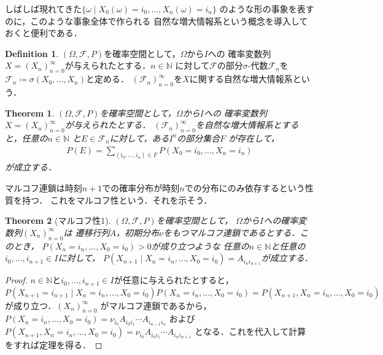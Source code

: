 \documentclass[dvipdfmx,autodetect-engine]{jsarticle}
\newtheorem{theorem}{Theorem}[section]
\theoremstyle{remark}
\theoremstyle{definition}
\newtheorem{definition}{Definition}[section]
\newcommand{\N}{\mathbb{N}}
\begin{document}
しばしば現れてきた$\{ \omega \mid X_0 (\omega)= i_0,\ldots, X_n (\omega)= i_n\}$
のような形の事象を表すのに，このような事象全体で作られる
自然な増大情報系という概念を導入しておくと便利である．
\begin{definition}
    $(\Omega,\mathcal{F},P)$を確率空間として，$\Omega$から$I$への
    確率変数列$X = (X_n)_{n=0}^{\infty}$が与えられたとする．$n \in \N$
    に対して$\mathcal{F}$の部分$\sigma$-代数$\mathcal{F}_n$を
    $\mathcal{F}_n \coloneqq \sigma (X_0,\ldots,X_n)$と定める．
    $(\mathcal{F}_n)_{n =0}^{\infty}$を$X$に関する自然な増大情報系という．
\end{definition}

\begin{theorem}
    $(\Omega,\mathcal{F},P)$を確率空間として，$\Omega$から$I$への
    確率変数列$X = (X_n)_{n=0}^{\infty}$が与えられたとする．
    $(\mathcal{F}_n)_{n=0}^{\infty}$を自然な増大情報系とすると，任意の$n \in \N$
    と$E \in \mathcal{F}_n$に対して，ある$I^n$の部分集合$F$
    が存在して，
    \begin{align}
        P(E) = \sum_{(i_0,\ldots,i_n) \in F} P(X_0 = i_0,\ldots,X_n = i_n)
    \end{align}
    が成立する．
\end{theorem}

マルコフ連鎖は時刻$n+1$での確率分布が時刻$n$での分布にのみ依存するという性質を持つ．
これをマルコフ性という．それを示そう．

\begin{theorem}[マルコフ性1]
    $(\Omega,\mathcal{F},P)$を確率空間として，
    $\Omega$から$I$への確率変数列$(X_n)_{n=0}^{\infty}$は
    遷移行列$A$，初期分布$\nu$をもつマルコフ連鎖であるとする．このとき，
    $P(X_n = i_n,\ldots,X_0 = i_0) >0$が成り立つような
    任意の$n \in \N$と任意の$i_0,\ldots,i_{n+1} \in I$に対して，
    $P(X_{n+1} \mid X_n = i_n,\ldots,X_0 = i_0)=A_{i_n i_{n+1}}$が成立する．
\end{theorem}

\begin{proof}
    $n \in \N$と$i_0,\ldots,i_{n+1} \in I$が任意に与えられたとすると，
    $P(X_{n+1}=i_{n+1} \mid X_n = i_n,\ldots,X_0 = i_0)P(X_n = i_n,\ldots,X_0 = i_0) 
    = P(X_{n+1},X_n = i_n,\ldots,X_0 = i_0)$が成り立つ．$(X_n)_{n=0}^{\infty}$
    がマルコフ連鎖であるから，$P(X_n = i_n,\ldots,X_0 = i_0) = \nu_{i_0} A_{i_0 i_1} \cdots A_{i_{n-1} i_n}$
    および$P(X_{n+1},X_n = i_n,\ldots,X_0 = i_0) = \nu_{i_0} A_{i_0 i_1} \cdots A_{i_{n} i_{n+1}}$
    となる．これを代入して計算をすれば定理を得る．
\end{proof}
\end{document}
